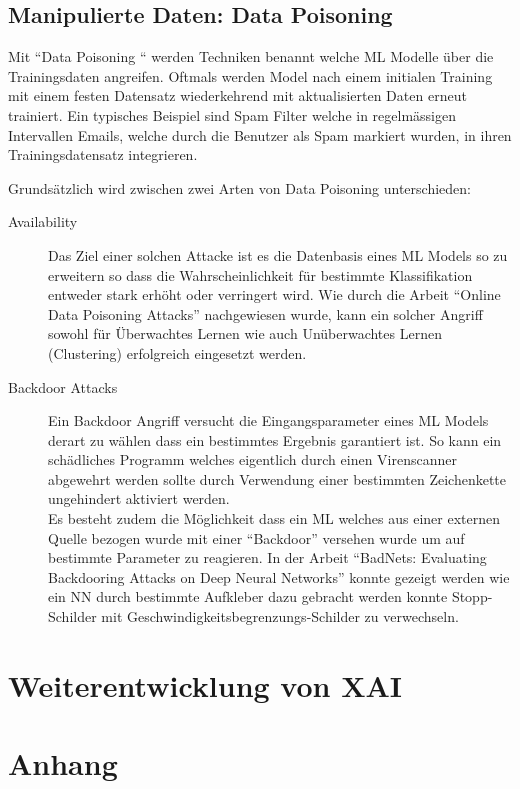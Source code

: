 \documentclass[
  12pt, %
  a4paper, %
  oneside, %
  openany, 
  numbers=noenddot, %
  BCOR=5mm, %
  parskip=half*, %
  thesis, %
]{bfhbook}
\begin{document}
\section{Manipulierte Daten: Data Poisoning}
\label{dataP}
Mit ``Data Poisoning `` werden Techniken benannt welche \Gls{ML} Modelle über die Trainingsdaten angreifen. Oftmals werden Model nach einem initialen Training mit einem festen Datensatz wiederkehrend mit aktualisierten Daten erneut trainiert. Ein typisches Beispiel sind Spam Filter welche in regelmässigen Intervallen Emails, welche durch die Benutzer als Spam markiert wurden, in ihren Trainingsdatensatz integrieren.
 
Grundsätzlich wird zwischen zwei Arten von Data Poisoning unterschieden:
\begin{description}
  		\item[Availability] Das Ziel einer solchen Attacke ist es die Datenbasis eines \Gls{ML} Models so zu erweitern so dass die Wahrscheinlichkeit für bestimmte Klassifikation entweder stark erhöht oder verringert wird. Wie durch die Arbeit ``Online Data Poisoning Attacks'' \parencite{Zhang2019} nachgewiesen wurde, kann ein solcher Angriff sowohl für Überwachtes Lernen wie auch Unüberwachtes Lernen (Clustering) erfolgreich eingesetzt werden. 
  		\item[Backdoor Attacks] Ein Backdoor Angriff versucht die Eingangsparameter eines \Gls{ML} Models derart zu wählen dass ein bestimmtes Ergebnis garantiert ist. So kann ein schädliches Programm welches eigentlich durch einen Virenscanner abgewehrt werden sollte durch Verwendung einer bestimmten Zeichenkette ungehindert aktiviert werden.\\
  		Es besteht zudem die Möglichkeit dass ein \Gls{ML} welches aus einer externen Quelle bezogen wurde mit einer ``Backdoor'' versehen wurde um auf bestimmte Parameter zu reagieren. In der Arbeit ``BadNets: Evaluating Backdooring Attacks
on Deep Neural Networks'' \parencite{Gu2019} konnte gezeigt werden wie ein \Gls{NN} durch bestimmte Aufkleber dazu gebracht werden konnte Stopp-Schilder mit Geschwindigkeitsbegrenzungs-Schilder zu verwechseln.
	\end{description}

\chapter{Weiterentwicklung von XAI}

\chapter{Anhang}
\end{document}
